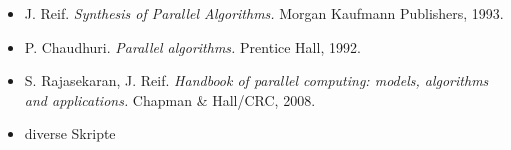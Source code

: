 \begin{frame}
    \frametitle{\insertsection}
    \begin{itemize}
        \item J. Reif. \emph{Synthesis of Parallel Algorithms.} Morgan Kaufmann Publishers, 1993.
        \item P. Chaudhuri. \emph{Parallel algorithms.} Prentice Hall, 1992.
        \item S. Rajasekaran, J. Reif. \emph{Handbook of parallel computing: models, algorithms and applications.} Chapman \& Hall/CRC, 2008.
        \item diverse Skripte
    \end{itemize}
\end{frame}


